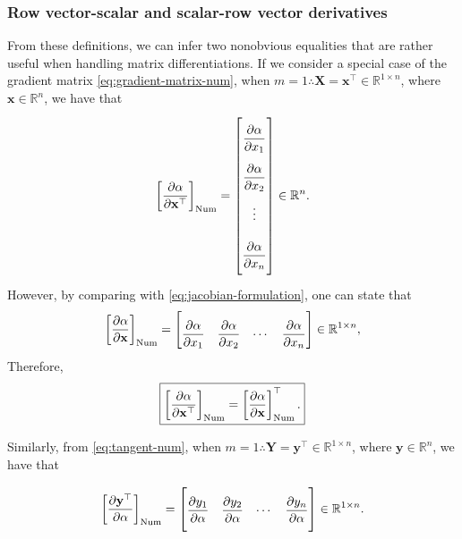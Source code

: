 \documentclass{article}
\begin{document}
\subsubsection{Row vector-scalar and scalar-row vector derivatives}

From these definitions, we can infer two nonobvious equalities that are rather useful when handling matrix differentiations. If we consider a special case of the gradient matrix \eqref{eq:gradient-matrix-num}, when $m=1 \therefore \mathbf{X} = \mathbf{x}^\top \in \mathbb{R}^{1\times n}$, where $\mathbf{x} \in \mathbb{R}^n$, we have that
\begin{align}
    \label{eq:hidden-num-1}
    \left[\dfrac{\partial \alpha}{\partial \mathbf{x}^\top}\right]_{\textnormal{Num}} = \renewcommand{\arraystretch}{2.6}\begin{bmatrix}
        \dfrac{\partial \alpha}{\partial x_{1}} \\
        \dfrac{\partial \alpha}{\partial x_{2}} \\
        \vdots \\
        \dfrac{\partial \alpha}{\partial x_{n}}\vspace{1.3ex}
    \end{bmatrix} \in \mathbb{R}^{n}.
\end{align}
However, by comparing with \eqref{eq:jacobian-formulation}, one can state that
\begin{align}
    \left[\dfrac{\partial \alpha}{\partial \mathbf{x}}\right]_{\textnormal{Num}} = \begin{bmatrix} \dfrac{\partial \alpha}{\partial x_{1}} & \dfrac{\partial \alpha}{\partial x_{2}} & \cdots & \dfrac{\partial \alpha}{\partial x_{n}} \end{bmatrix} \in \mathbb{R}^{1 \times n},
\end{align}
Therefore,
\begin{align}
    \label{eq:hidden-num}
    \boxed{\left[\dfrac{\partial \alpha}{\partial \mathbf{x}^\top}\right]_{\textnormal{Num}} = \left[\dfrac{\partial \alpha}{\partial \mathbf{x}}\right]_{\textnormal{Num}}^\top.}
\end{align}

Similarly, from \eqref{eq:tangent-num}, when $m=1 \therefore \mathbf{Y} = \mathbf{y}^\top \in \mathbb{R}^{1\times n}$, where $\mathbf{y} \in \mathbb{R}^n$, we have that

\begin{align}
    \left[\dfrac{\partial \mathbf{y}^\top}{\partial \alpha}\right]_{\textnormal{Num}} = \renewcommand{\arraystretch}{2.6}\begin{bmatrix}
        \dfrac{\partial y_{1}}{\partial \alpha} &
        \dfrac{\partial y_{2}}{\partial \alpha} &
        \cdots &
        \dfrac{\partial y_{n}}{\partial \alpha}\vspace{1.3ex}
    \end{bmatrix} \in \mathbb{R}^{1 \times n}.
\end{align}
\end{document}

